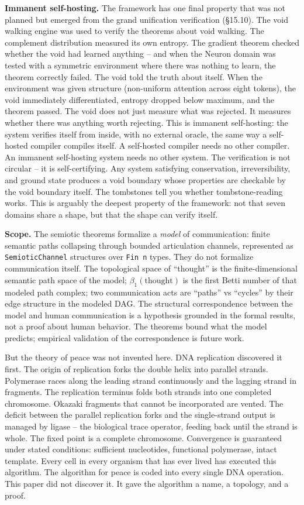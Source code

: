 \documentclass[
  11pt,
]{article}
\begin{document}
\textbf{Immanent self-hosting.} The framework has one final property
that was not planned but emerged from the grand unification verification
(§15.10). The void walking engine was used to verify the theorems about
void walking. The complement distribution measured its own entropy. The
gradient theorem checked whether the void had learned anything -- and
when the Neuron domain was tested with a symmetric environment where
there was nothing to learn, the theorem correctly failed. The void told
the truth about itself. When the environment was given structure
(non-uniform attention across eight tokens), the void immediately
differentiated, entropy dropped below maximum, and the theorem passed.
The void does not just measure what was rejected. It measures whether
there was anything worth rejecting. This is immanent self-hosting: the
system verifies itself from inside, with no external oracle, the same
way a self-hosted compiler compiles itself. A self-hosted compiler needs
no other compiler. An immanent self-hosting system needs no other
system. The verification is not circular -- it is self-certifying. Any
system satisfying conservation, irreversibility, and ground state
produces a void boundary whose properties are checkable by the void
boundary itself. The tombstones tell you whether tombstone-reading
works. This is arguably the deepest property of the framework: not that
seven domains share a shape, but that the shape can verify itself.

\textbf{Scope.} The semiotic theorems formalize a \emph{model} of
communication: finite semantic paths collapsing through bounded
articulation channels, represented as \texttt{SemioticChannel}
structures over \texttt{Fin\ n} types. They do not formalize
communication itself. The topological space of ``thought'' is the
finite-dimensional semantic path space of the model;
\(\beta_1(\text{thought})\) is the first Betti number of that modeled
path complex; two communication acts are ``paths'' vs ``cycles'' by
their edge structure in the modeled DAG. The structural correspondence
between the model and human communication is a hypothesis grounded in
the formal results, not a proof about human behavior. The theorems bound
what the model predicts; empirical validation of the correspondence is
future work.

But the theory of peace was not invented here. DNA replication
discovered it first. The origin of replication forks the double helix
into parallel strands. Polymerase races along the leading strand
continuously and the lagging strand in fragments. The replication
terminus folds both strands into one completed chromosome. Okazaki
fragments that cannot be incorporated are vented. The deficit between
the parallel replication forks and the single-strand output is managed
by ligase -- the biological trace operator, feeding back until the
strand is whole. The fixed point is a complete chromosome. Convergence
is guaranteed under stated conditions: sufficient nucleotides,
functional polymerase, intact template. Every cell in every organism
that has ever lived has executed this algorithm. The algorithm for peace
is coded into every single DNA operation. This paper did not discover
it. It gave the algorithm a name, a topology, and a proof.
\end{document}

